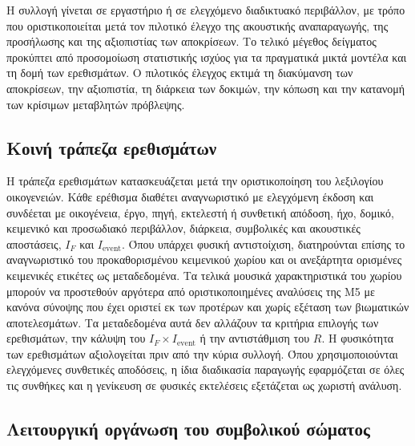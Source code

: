 \documentclass[11pt,a4paper]{article}
\begin{document}
Η συλλογή γίνεται σε εργαστήριο ή σε ελεγχόμενο διαδικτυακό περιβάλλον, με τρόπο που οριστικοποιείται μετά τον πιλοτικό έλεγχο της ακουστικής αναπαραγωγής, της προσήλωσης και της αξιοπιστίας των αποκρίσεων. Το τελικό μέγεθος δείγματος προκύπτει από προσομοίωση στατιστικής ισχύος για τα πραγματικά μικτά μοντέλα και τη δομή των ερεθισμάτων. Ο πιλοτικός έλεγχος εκτιμά τη διακύμανση των αποκρίσεων, την αξιοπιστία, τη διάρκεια των δοκιμών, την κόπωση και την κατανομή των κρίσιμων μεταβλητών πρόβλεψης.

\subsection{Κοινή τράπεζα ερεθισμάτων}\label{app:human-stimuli}

Η τράπεζα ερεθισμάτων κατασκευάζεται μετά την οριστικοποίηση του λεξιλογίου οικογενειών. Κάθε ερέθισμα διαθέτει αναγνωριστικό με ελεγχόμενη έκδοση και συνδέεται με οικογένεια, έργο, πηγή, εκτελεστή ή συνθετική απόδοση, ήχο, δομικό, κειμενικό και προσωδιακό περιβάλλον, διάρκεια, συμβολικές και ακουστικές αποστάσεις, $I_F$ και $I_{\mathrm{event}}$. Όπου υπάρχει φυσική αντιστοίχιση, διατηρούνται επίσης το αναγνωριστικό του προκαθορισμένου κειμενικού χωρίου και οι ανεξάρτητα ορισμένες κειμενικές ετικέτες ως μεταδεδομένα. Τα τελικά μουσικά χαρακτηριστικά του χωρίου μπορούν να προστεθούν αργότερα από οριστικοποιημένες αναλύσεις της M5 με κανόνα σύνοψης που έχει οριστεί εκ των προτέρων και χωρίς εξέταση των βιωματικών αποτελεσμάτων. Τα μεταδεδομένα αυτά δεν αλλάζουν τα κριτήρια επιλογής των ερεθισμάτων, την κάλυψη του $I_F\times I_{\mathrm{event}}$ ή την αντιστάθμιση του $R$. Η φυσικότητα των ερεθισμάτων αξιολογείται πριν από την κύρια συλλογή. Όπου χρησιμοποιούνται ελεγχόμενες συνθετικές αποδόσεις, η ίδια διαδικασία παραγωγής εφαρμόζεται σε όλες τις συνθήκες και η γενίκευση σε φυσικές εκτελέσεις εξετάζεται ως χωριστή ανάλυση.

\subsection{Λειτουργική οργάνωση του συμβολικού σώματος}\label{app:human-functional}
\end{document}
